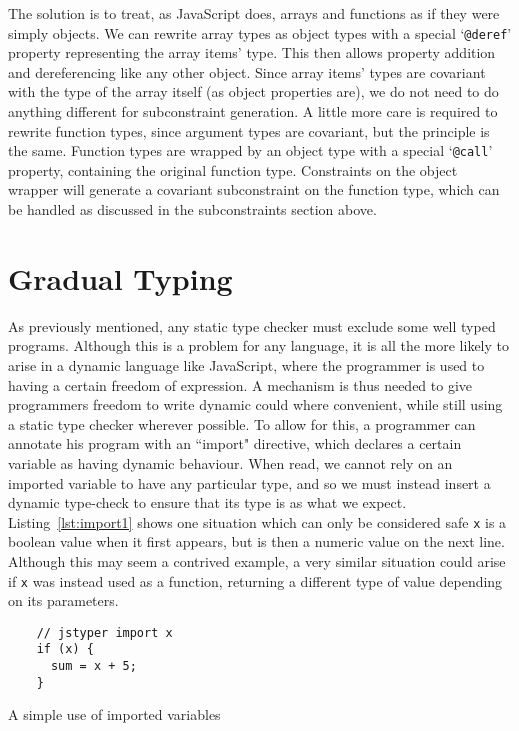 \documentclass[12pt,a4paper,twoside,openright]{report}
\theoremstyle{definition}
\theoremstyle{dotless}
\newcommand*{\js}{\texttt}
\begin{document}
The solution is to treat, as JavaScript does, arrays and functions as if they
were simply objects. We can rewrite array types as object types with a special
`\texttt{@deref}' property representing the array items' type. This then allows
property addition and dereferencing like any other object. Since array items'
types are covariant with the type of the array itself (as object properties
are), we do not need to do anything different for subconstraint generation. A
little more care is required to rewrite function types, since argument types
are covariant, but the principle is the same. Function types are wrapped by an
object type with a special `\texttt{@call}' property, containing the original
function type. Constraints on the object wrapper will generate a covariant
subconstraint on the function type, which can be handled as discussed in the
subconstraints section above.

\section{Gradual Typing}

As previously mentioned, any static type checker must exclude some well typed
programs.  Although this is a problem for any language, it is all the more
likely to arise in a dynamic language like JavaScript, where the programmer is
used to having a certain freedom of expression. A mechanism is thus needed to
give programmers freedom to write dynamic could where convenient, while still
using a static type checker wherever possible. To allow for this, a programmer
can annotate his program with an ``import" directive, which declares a certain
variable as having dynamic behaviour. When read, we cannot rely on an imported
variable to have any particular type, and so we must instead insert a dynamic
type-check to ensure that its type is as what we expect.
Listing~\ref{lst:import1} shows one situation which can only be considered safe
\js{x} is a boolean value when it first appears, but is then a numeric value on
the next line. Although this may seem a contrived example, a very similar
situation could arise if \js{x} was instead used as a function, returning a
different type of value depending on its parameters.
\begin{program}
  \begin{verbatim}
	// jstyper import x
	if (x) {
	  sum = x + 5;
	}
  \end{verbatim}
  \caption{A simple use of imported variables}\label{lst:import1}
\end{program}
\end{document}
